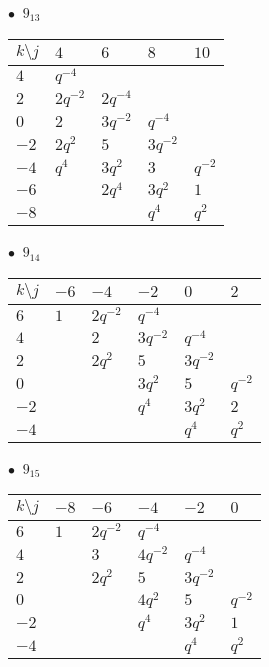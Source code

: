 %
\begin{minipage}{\linewidth}
$\bullet\ $ $9_{13}$ \vspace{0.5em} \\
\begin{tabular}{l|llll}
$k \setminus j$ & $4$ & $6$ & $8$ & $10$ \\
\hline
$4$ & $q^{-4}$ &  &  &  \\
$2$ & $2q^{-2}$ & $2q^{-4}$ &  &  \\
$0$ & $2$ & $3q^{-2}$ & $q^{-4}$ &  \\
$-2$ & $2q^{2}$ & $5$ & $3q^{-2}$ &  \\
$-4$ & $q^{4}$ & $3q^{2}$ & $3$ & $q^{-2}$ \\
$-6$ &  & $2q^{4}$ & $3q^{2}$ & $1$ \\
$-8$ &  &  & $q^{4}$ & $q^{2}$ \\
\end{tabular}
\vspace{2em}
\end{minipage}
%
\begin{minipage}{\linewidth}
$\bullet\ $ $9_{14}$ \vspace{0.5em} \\
\begin{tabular}{l|lllll}
$k \setminus j$ & $-6$ & $-4$ & $-2$ & $0$ & $2$ \\
\hline
$6$ & $1$ & $2q^{-2}$ & $q^{-4}$ &  &  \\
$4$ &  & $2$ & $3q^{-2}$ & $q^{-4}$ &  \\
$2$ &  & $2q^{2}$ & $5$ & $3q^{-2}$ &  \\
$0$ &  &  & $3q^{2}$ & $5$ & $q^{-2}$ \\
$-2$ &  &  & $q^{4}$ & $3q^{2}$ & $2$ \\
$-4$ &  &  &  & $q^{4}$ & $q^{2}$ \\
\end{tabular}
\vspace{2em}
\end{minipage}
%
\begin{minipage}{\linewidth}
$\bullet\ $ $9_{15}$ \vspace{0.5em} \\
\begin{tabular}{l|lllll}
$k \setminus j$ & $-8$ & $-6$ & $-4$ & $-2$ & $0$ \\
\hline
$6$ & $1$ & $2q^{-2}$ & $q^{-4}$ &  &  \\
$4$ &  & $3$ & $4q^{-2}$ & $q^{-4}$ &  \\
$2$ &  & $2q^{2}$ & $5$ & $3q^{-2}$ &  \\
$0$ &  &  & $4q^{2}$ & $5$ & $q^{-2}$ \\
$-2$ &  &  & $q^{4}$ & $3q^{2}$ & $1$ \\
$-4$ &  &  &  & $q^{4}$ & $q^{2}$ \\
\end{tabular}
\vspace{2em}
\end{minipage}

